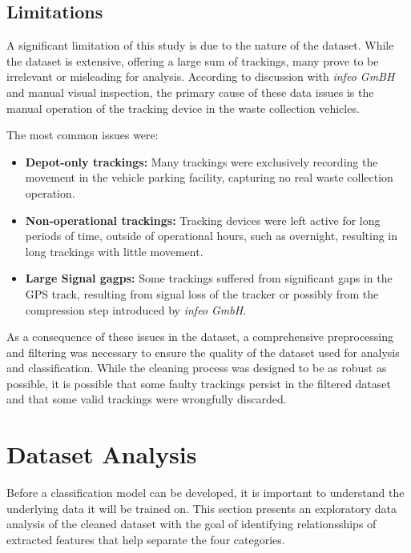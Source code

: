 \documentclass[a4paper,12pt,twoside]{scrreprt}
\begin{document}
\subsection{Limitations}

A significant limitation of this study is due to the nature of the dataset.
While the dataset is extensive, offering a large sum of trackings, many prove
to be irrelevant or misleading for analysis.
According to discussion with \textit{infeo GmBH} and manual visual inspection,
the primary cause of these data issues is the manual operation of the tracking
device in the waste collection vehicles.

The most common issues were:

\begin{itemize}
  \item \textbf{Depot-only trackings:} Many trackings were exclusively
        recording the movement in the vehicle parking facility, capturing no
        real waste
        collection operation.
  \item \textbf{Non-operational trackings:} Tracking devices were left active
        for long periods of time, outside of operational hours, such as
        overnight,
        resulting in long trackings with little movement.
  \item \textbf{Large Signal gagps:} Some trackings suffered from significant
        gaps in the GPS track, resulting from signal loss of the tracker or
        possibly from the compression step introduced by \textit{infeo GmbH}.
\end{itemize}

As a consequence of these issues in the dataset, a comprehensive preprocessing
and filtering was necessary to ensure the quality of the dataset used for
analysis and
classification.
While the cleaning process was designed to be as robust as possible, it is
possible that some faulty trackings persist in the filtered dataset and that
some valid trackings were wrongfully discarded.

\section{Dataset Analysis}
Before a classification model can be developed, it is important to understand
the underlying data it will be trained on.
This section presents an exploratory data analysis of the cleaned dataset with
the goal of identifying relationsships of extracted features that help separate
the
four categories.
\end{document}
